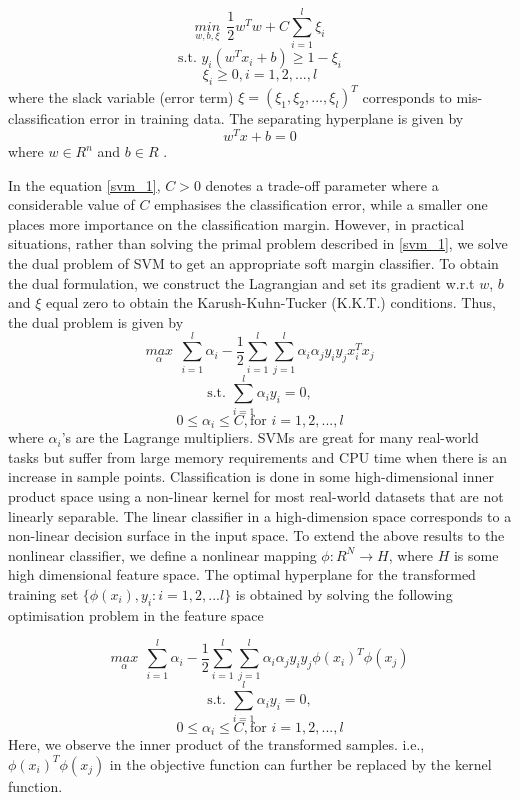 \documentclass[12pt,a4paper,oneside,english]{report}
\begin{document}
\begin{equation} \label{svm_1}
 \underset {w,b,\xi}{min} \  \ \frac{1}{2}w^Tw + C\sum_{i=1}^{l} \xi_i 
\end{equation}
\[\text{s.t. } y_i(w^Tx_i+b) \geq 1 - \xi_i \]
\[ \xi_i \geq 0, i = 1,2,...,l\]
where the slack variable (error term) \( \xi  = (\xi_{1}, \xi_{2},...,\xi_{l})^T\) corresponds to mis-classification error in  training data. The separating hyperplane is given by
\begin{equation} \label{svm_2}
	w^Tx+b=0 \end{equation}
where \(w \in R^n\) and \(b \in R\) .

In the equation \ref{svm_1}, $C>0$ denotes a trade-off parameter where a considerable value of $C$ emphasises the classification error, while a smaller one places more importance on the classification margin.
However, in practical situations, rather than solving the primal problem described in \ref{svm_1}, we solve the dual problem of SVM to get an appropriate soft margin classifier. To obtain the dual formulation, we construct the Lagrangian and set its gradient w.r.t $w$, $b$ and $\xi$ equal zero to obtain the Karush-Kuhn-Tucker (K.K.T.) conditions. Thus, the dual problem is given by
\begin{equation} \label{svm_3}
\underset {\alpha}{max} \ \ \sum_{i=1}^{l}\alpha_i - \frac{1}{2} \sum_{i=1}^{l} \sum_{j=1}^{l} \alpha_i \alpha_j y_i y_j x_i^T x_j 
\end{equation}
\[\text{s.t. } \sum_{i=1}^l \alpha_i y_i = 0, \]
\[0 \leq \alpha_i \leq C, \text{for } i = 1,2,...,l\]
where $\alpha_i$'s are the Lagrange multipliers. SVMs are great for many real-world tasks but suffer from large memory requirements and CPU time when there is an increase in sample points. 
Classification is done in some high-dimensional inner product space using a non-linear kernel for most real-world datasets that are not linearly separable. The linear classifier in a high-dimension space corresponds to a non-linear decision surface in the input space. To extend the above results to the nonlinear classifier, we define a nonlinear mapping $\phi: R^N \to H$, where $H$ is some high dimensional feature space. The optimal hyperplane for the transformed training set $\{ \phi(x_i),y_i : i=1,2,...l\}$ is obtained by solving the following optimisation problem in the feature space

\begin{equation} \label{svm_4}
\underset {\alpha}{max} \ \ \sum_{i=1}^{l}\alpha_i - \frac{1}{2} \sum_{i=1}^{l} \sum_{j=1}^{l} \alpha_i \alpha_j y_i y_j \phi(x_i)^T \phi(x_j) 
\end{equation}
\[\text{s.t. } \sum_{i=1}^l \alpha_i y_i = 0, \]
\[0 \leq \alpha_i \leq C, \text{for } i = 1,2,...,l\]
Here, we observe the inner product of the transformed samples. i.e., $\phi(x_i)^T\phi(x_j)$ in the objective function can further be replaced by the kernel function.
\end{document}
